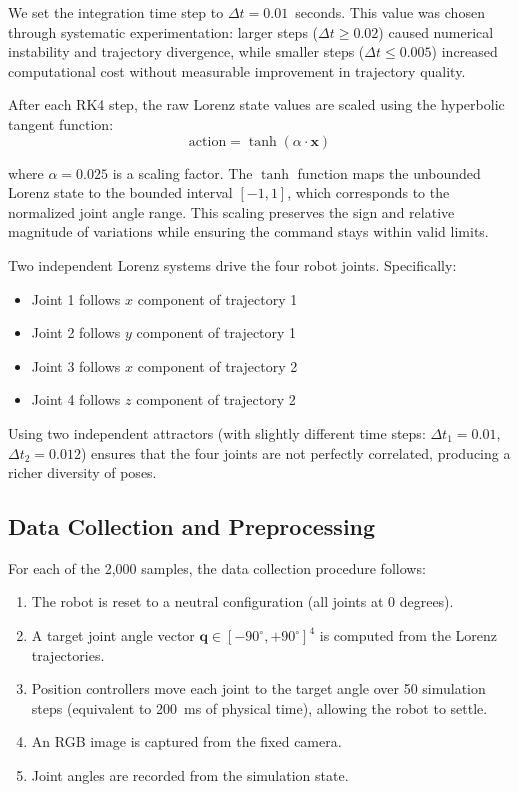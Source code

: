 \documentclass[12pt,a4paper,oneside]{report}
\begin{document}
We set the integration time step to $\Delta t = 0.01$~seconds. This value was chosen through systematic experimentation: larger steps ($\Delta t \geq 0.02$) caused numerical instability and trajectory divergence, while smaller steps ($\Delta t \leq 0.005$) increased computational cost without measurable improvement in trajectory quality.

After each RK4 step, the raw Lorenz state values are scaled using the hyperbolic tangent function:
\begin{equation}\text{action} = \tanh(\alpha \cdot \mathbf{x})
\end{equation}

where $\alpha = 0.025$ is a scaling factor. The $\tanh$ function maps the unbounded Lorenz state to the bounded interval $[-1, 1]$, which corresponds to the normalized joint angle range. This scaling preserves the sign and relative magnitude of variations while ensuring the command stays within valid limits.

Two independent Lorenz systems drive the four robot joints. Specifically:
\begin{itemize}
    \item Joint 1 follows $x$ component of trajectory 1

    \item Joint 2 follows $y$ component of trajectory 1

    \item Joint 3 follows $x$ component of trajectory 2

    \item Joint 4 follows $z$ component of trajectory 2

\end{itemize}

Using two independent attractors (with slightly different time steps: $\Delta t_1 = 0.01$, $\Delta t_2 = 0.012$) ensures that the four joints are not perfectly correlated, producing a richer diversity of poses.
\subsection{Data Collection and Preprocessing}
\label{subsec:data_collection_and_preprocessing}

For each of the 2,000 samples, the data collection procedure follows:
\begin{enumerate}
    \item The robot is reset to a neutral configuration (all joints at 0 degrees).
    \item A target joint angle vector $\mathbf{q} \in [-90^\circ, +90^\circ]^4$ is computed from the Lorenz trajectories.
    \item Position controllers move each joint to the target angle over 50 simulation steps (equivalent to 200~ms of physical time), allowing the robot to settle.
    \item An RGB image is captured from the fixed camera.
    \item Joint angles are recorded from the simulation state.
\end{enumerate}
\end{document}
